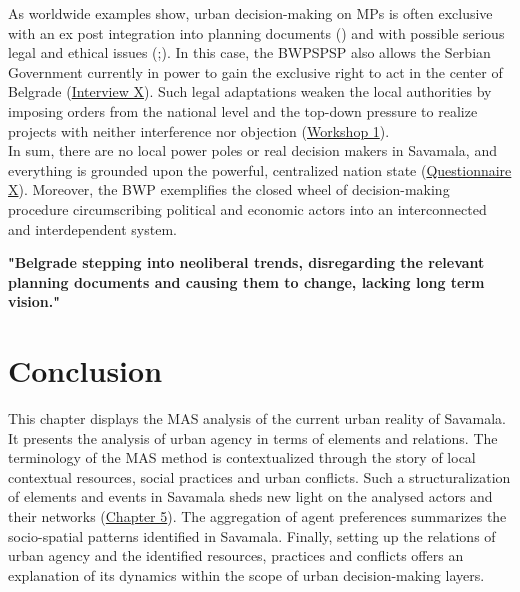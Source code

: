 \documentclass[11pt]{report}
\begin{document}
As worldwide examples show, urban decision-making on MPs is often exclusive with an ex post integration into planning documents (\cite{Kennedy et al., 2014})
and with possible serious legal and ethical issues (\href{Flyvbjerg2009}{\citealt{Flyvbjerg2009}};\href{Flyvbjerg2003}{\citealt{Flyvbjerg2003}}).%
In this case, the BWPSPSP also allows the Serbian Government currently in power to gain the exclusive right to act in the center of Belgrade  (\href{InterviewX}{Interview X}).
Such legal adaptations weaken the local authorities by imposing orders from the national level and the top-down pressure to realize projects with neither interference nor objection
(\href{Expert Workshop}{Workshop 1}).
\\

In sum, there are no local power poles or real decision makers in Savamala, and everything is grounded upon the powerful, centralized nation state
(\href{Questionnaire Experts Savamala}{Questionnaire X}).
Moreover, the BWP exemplifies the closed wheel of decision-making procedure circumscribing political and economic actors into an interconnected and interdependent system.

\textbf{"Belgrade stepping into neoliberal trends, disregarding the relevant planning documents and causing them to change, lacking long term vision."} \cite{doytchinov_belgrade:_2015}

\section{Conclusion}

This chapter displays the MAS analysis of  the current urban reality of Savamala. It presents the analysis of urban agency in terms of elements and relations. The terminology of the MAS method is contextualized through the story of local contextual resources, social practices and urban conflicts. Such a structuralization of elements and events in Savamala sheds new light on the  analysed actors and their networks (\href{Chapter 5}{Chapter 5}). The aggregation of agent preferences summarizes the socio-spatial patterns identified in Savamala. Finally, setting up the relations of urban agency and the identified resources, practices and conflicts offers an explanation of its dynamics within the scope of urban decision-making layers.
\\
\end{document}
